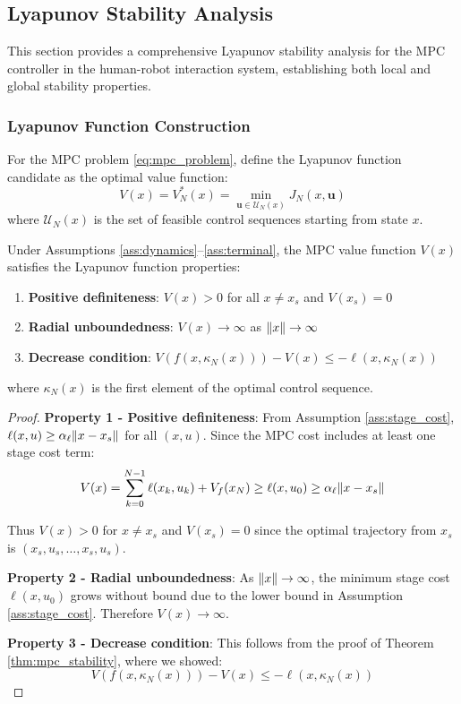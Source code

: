 \subsection{Lyapunov Stability Analysis}

This section provides a comprehensive Lyapunov stability analysis for the MPC controller in the human-robot interaction system, establishing both local and global stability properties.

\subsubsection{Lyapunov Function Construction}

\begin{definition}
\label{def:mpc_lyapunov}
For the MPC problem \eqref{eq:mpc_problem}, define the Lyapunov function candidate as the optimal value function:
$$V(x) = V_N^*(x) = \min_{\mathbf{u} \in \mathcal{U}_N(x)} J_N(x, \mathbf{u})$$
where $\mathcal{U}_N(x)$ is the set of feasible control sequences starting from state $x$.
\end{definition}

\begin{theorem}
\label{thm:lyapunov_properties}
Under Assumptions \ref{ass:dynamics}--\ref{ass:terminal}, the MPC value function $V(x)$ satisfies the Lyapunov function properties:

\begin{enumerate}
    \item \textbf{Positive definiteness}: $V(x) > 0$ for all $x \neq x_s$ and $V(x_s) = 0$
    \item \textbf{Radial unboundedness}: $V(x) \to \infty$ as $\lVert x\rVert \to \infty$
    \item \textbf{Decrease condition}: $V(f(x, \kappa_N(x))) - V(x) \leq -\ell(x, \kappa_N(x))$
\end{enumerate}

where $\kappa_N(x)$ is the first element of the optimal control sequence.
\end{theorem}

\begin{proof}
\textbf{Property 1 - Positive definiteness}:
From Assumption \ref{ass:stage_cost}, $\ell(x, u) \geq \alpha_\ell \lVert x - x_s\rVert$ for all $(x, u)$. Since the MPC cost includes at least one stage cost term:
$$V(x) = \sum_{k=0}^{N-1} \ell(x_k, u_k) + V_f(x_N) \geq \ell(x, u_0) \geq \alpha_\ell \lVert x - x_s\rVert$$

Thus $V(x) > 0$ for $x \neq x_s$ and $V(x_s) = 0$ since the optimal trajectory from $x_s$ is $(x_s, u_s, \ldots, x_s, u_s)$.

\textbf{Property 2 - Radial unboundedness}:
As $\lVert x\rVert \to \infty$, the minimum stage cost $\ell(x, u_0)$ grows without bound due to the lower bound in Assumption \ref{ass:stage_cost}. Therefore $V(x) \to \infty$.

\textbf{Property 3 - Decrease condition}:
This follows from the proof of Theorem \ref{thm:mpc_stability}, where we showed:
$$V(f(x, \kappa_N(x))) - V(x) \leq -\ell(x, \kappa_N(x))$$
\end{proof}

